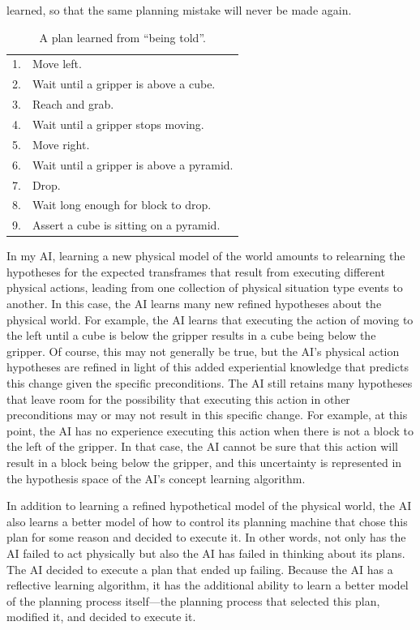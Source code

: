 learned, so that the same planning mistake will never be made again.
\begin{table}
\centering
\begin{tabular}{|rl|}
\hline
 1. & Move left.\\
 2. & Wait until a gripper is above a cube.\\
 3. & Reach and grab.\\
 4. & Wait until a gripper stops moving.\\
 5. & Move right.\\
 6. & Wait until a gripper is above a pyramid.\\
 7. & Drop.\\
 8. & Wait long enough for block to drop.\\
 9. & Assert a cube is sitting on a pyramid.\\
\hline
\end{tabular}
\caption[A plan learned from ``being told''.]{A plan learned from
  ``being told''.}
\label{table:a_plan_learned_from_being_told}
\end{table}
In my AI, learning a new physical model of the world amounts to
relearning the hypotheses for the expected transframes that result
from executing different physical actions, leading from one collection
of physical situation type events to another.  In this case, the AI
learns many new refined hypotheses about the physical world.  For
example, the AI learns that executing the action of moving to the left
until a cube is below the gripper results in a cube being below the
gripper.  Of course, this may not generally be true, but the AI's
physical action hypotheses are refined in light of this added
experiential knowledge that predicts this change given the specific
preconditions.  The AI still retains many hypotheses that leave room
for the possibility that executing this action in other preconditions
may or may not result in this specific change.  For example, at this
point, the AI has no experience executing this action when there is
not a block to the left of the gripper.  In that case, the AI cannot
be sure that this action will result in a block being below the
gripper, and this uncertainty is represented in the hypothesis space
of the AI's concept learning algorithm.

In addition to learning a refined hypothetical model of the physical
world, the AI also learns a better model of how to control its
planning machine that chose this plan for some reason and decided to
execute it.  In other words, not only has the AI failed to act
physically but also the AI has failed in thinking about its plans.
The AI decided to execute a plan that ended up failing.  Because the
AI has a reflective learning algorithm, it has the additional ability
to learn a better model of the planning process itself---the planning
process that selected this plan, modified it, and decided to execute
it.

